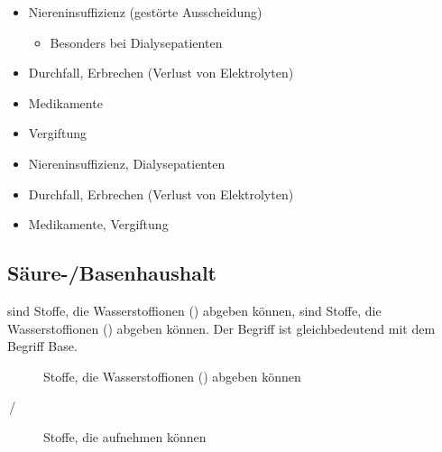 {
\label{topic:elektrolytstoerungen}
\label{topic:dialyse-elektrolyte}

\begin{itemize}
    \item Niereninsuffizienz (gestörte Ausscheidung)
    \begin{itemize}
        \item Besonders bei Dialysepatienten
    \end{itemize}
    \item Durchfall, Erbrechen (Verlust von Elektrolyten)
    \item Medikamente
    \item Vergiftung
\end{itemize}
}{
\begin{itemize}
    \item Niereninsuffizienz, Dialysepatienten
    \item Durchfall, Erbrechen (Verlust von Elektrolyten)
    \item Medikamente, Vergiftung
\end{itemize}
}{}{}{}




\subsection{Säure-/Basenhaushalt}
\label{topic:saeure-basen-haushalt}

{
 sind Stoffe, die 
Wasserstoffionen () abgeben können,  sind 
Stoffe, die Wasserstoffionen () abgeben können. Der Begriff
 ist gleichbedeutend mit dem Begriff Base. 
}{
\begin{description}
  \item[] Stoffe, die
  Wasserstoffionen () abgeben können
  \item[\,/\,] Stoffe, die  aufnehmen können
\end{description}
}{}{}{}




